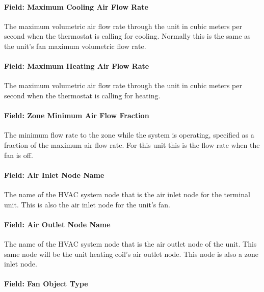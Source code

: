 \paragraph{Field: Maximum Cooling Air Flow Rate}\label{field-maximum-cooling-air-flow-rate}

The maximum volumetric air flow rate through the unit in cubic meters per second when the thermostat is calling for cooling. Normally this is the same as the unit's fan maximum volumetric flow rate.

\paragraph{Field: Maximum Heating Air Flow Rate}\label{field-maximum-heating-air-flow-rate}

The maximum volumetric air flow rate through the unit in cubic meters per second when the thermostat is calling for heating.

\paragraph{Field: Zone Minimum Air Flow Fraction}\label{field-zone-minimum-air-flow-fraction}

The minimum flow rate to the zone while the system is operating, specified as a fraction of the maximum air flow rate. For this unit this is the flow rate when the fan is off.

\paragraph{Field: Air Inlet Node Name}\label{field-air-inlet-node-name-2}

The name of the HVAC system node that is the air inlet node for the terminal unit. This is also the air inlet node for the unit's fan.

\paragraph{Field: Air Outlet Node Name}\label{field-air-outlet-node-name-2}

The name of the HVAC system node that is the air outlet node of the unit. This same node will be the unit heating coil's air outlet node. This node is also a zone inlet node.

\paragraph{Field: Fan Object Type}\label{field-fan-object-type}

